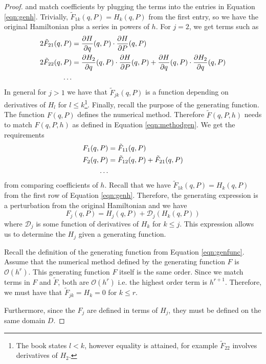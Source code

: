 \begin{proof}
	and match coefficients by plugging the terms into the entries in Equation \ref{eqn:genh}.
	Trivially, $\tilde{F}_{1k}(q,P) = H_k(q,P)$ from the first entry, so we have the original Hamiltonian plus a series in powers of $h$.
	For $j=2$, we get terms such as
	\begin{align*}
		2 \tilde{F}_{21}(q,P) &= \frac{\partial H}{\partial q}(q,P) \cdot \frac{\partial H}{\partial P}(q,P) \\
		2 \tilde{F}_{22}(q,P) &= \frac{\partial H_2}{\partial q}(q,P) \cdot \frac{\partial H}{\partial P}(q,P) + \frac{\partial H}{\partial q}(q,P) \cdot \frac{\partial H_2}{\partial q}(q,P) \\
		\mathellipsis
	\end{align*}
	In general for $j > 1$ we have that $\tilde{F}_{jk}(q,P)$ is a function depending on derivatives of $H_l$ for $l \leq k$\footnote{
		The book states $l < k$, however equality is attained, for example $\tilde{F}_{22}$ involves derivatives of $H_2$.
	}.
	Finally, recall the purpose of the generating function.
	The function $F(q,P)$ defines the numerical method.
	Therefore $\tilde{F}(q,P,h)$ needs to match $F(q,P,h)$ as defined in Equation \ref{eqn:methodgen}.
	We get the requirements
	\begin{align*}
		F_1(q,P) &= \tilde{F}_{11}(q,P) \\
		F_2(q,P) &= \tilde{F}_{12}(q,P) + \tilde{F}_{21}(q,P) \\
		\mathellipsis
	\end{align*}
	from comparing coefficients of $h$.
	Recall that we have $\tilde{F}_{1k}(q,P) = H_k(q,P)$ from the first row of Equation \ref{eqn:genh}.
	Therefore, the generating expression is a perturbation from the original Hamiltonian and we have
	\begin{equation*}
		F_j(q,P) = H_j(q,P) + \mathcal{D}_j(H_k(q,P))
	\end{equation*}
	where $\mathcal{D}_j$ is some function of derivatives of $H_k$ for $k \leq j$.
	This expression allows us to determine the $H_j$ given a generating function.
	
	Recall the definition of the generating function from Equation \ref{eqn:genfunc}. %
	Assume that the numerical method defined by the generating function $F$ is $\mathcal{O}(h^r)$.
	This generating function $F$ itself is the same order.
	Since we match terms in $F$ and $\tilde{F}$, both are $\mathcal{O}(h^r)$ i.e. the highest order term is $h^{r+1}$.
	Therefore, we must have that $\tilde{F}_{jk} = H_k = 0$ for $k \leq r$.

	Furthermore, since the $F_j$ are defined in terms of $H_j$, they must be defined on the same domain $D$.
\end{proof}

